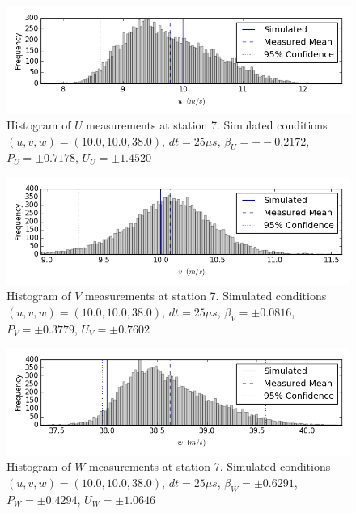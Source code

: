 \begin{figure}[H]
\centering
\includegraphics[width=6in]{figs/Ely_May28th07004/uncertainty_Ely_May28th07004_U}
\caption{Histogram of $U$ measurements at station 7. Simulated conditions $(u,v,w)=(10.0, 10.0, 38.0)$, $dt=25 \mu s$, $\beta_U=\pm -0.2172$, $P_U=\pm 0.7178$, $U_U=\pm 1.4520$}
\label{fig:uncertainty_Ely_May28th07004_U}
\end{figure}


\begin{figure}[H]
\centering
\includegraphics[width=6in]{figs/Ely_May28th07004/uncertainty_Ely_May28th07004_V}
\caption{Histogram of $V$ measurements at station 7. Simulated conditions $(u,v,w)=(10.0, 10.0, 38.0)$, $dt=25 \mu s$, $\beta_V=\pm 0.0816$, $P_V=\pm 0.3779$, $U_V=\pm 0.7602$}
\label{fig:uncertainty_Ely_May28th07004_V}
\end{figure}


\begin{figure}[H]
\centering
\includegraphics[width=6in]{figs/Ely_May28th07004/uncertainty_Ely_May28th07004_W}
\caption{Histogram of $W$ measurements at station 7. Simulated conditions $(u,v,w)=(10.0, 10.0, 38.0)$, $dt=25 \mu s$, $\beta_W=\pm 0.6291$, $P_W=\pm 0.4294$, $U_W=\pm 1.0646$}
\label{fig:uncertainty_Ely_May28th07004_W}
\end{figure}


